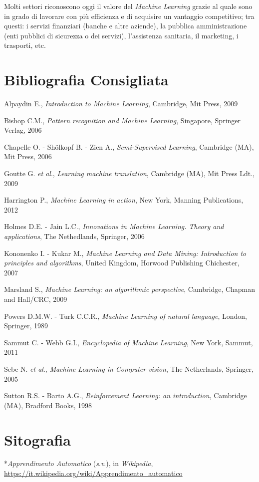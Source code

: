 {{Molti settori riconoscono oggi il valore del \emph{Machine Learning}
grazie al quale sono in grado di lavorare con più efficienza e di
acquisire un vantaggio competitivo; tra questi: i servizi finanziari
(banche e altre aziende), la pubblica amministrazione (enti pubblici di
sicurezza o dei servizi), l'assistenza sanitaria, il marketing, i
trasporti, etc.

\section*{Bibliografia Consigliata}
{\parindent0pt 
Alpaydin E., \emph{Introduction to Machine Learning}, Cambridge, Mit
Press, 2009

Bishop C.M., \emph{Pattern recognition and Machine Learning}, Singapore,
Springer Verlag, 2006

Chapelle O. - Shölkopf B. - Zien A., \emph{Semi-Supervised Learning},
Cambridge (MA), Mit Press, 2006

Goutte G. \emph{et al}., \emph{Learning machine translation}, Cambridge
(MA), Mit Press Ldt., 2009

Harrington P., \emph{Machine Learning in action}, New York, Manning
Publications, 2012

Holmes D.E. - Jain L.C., \emph{Innovations in Machine Learning. Theory
and applications}, The Nethedlands, Springer, 2006

Kononenko I. - Kukar M., \emph{Machine Learning and Data Mining:
Introduction to principles and algorithms}, United Kingdom, Horwood
Publishing Chichester, 2007

Marsland S., \emph{Machine Learning: an algorithmic perspective},
Cambridge, Chapman and Hall/CRC, 2009

Powers D.M.W. - Turk C.C.R., \emph{Machine Learning of natural
language}, London, Springer, 1989

Sammut C. - Webb G.I., \emph{Encyclopedia of Machine Learning}, New
York, Sammut, 2011

Sebe N. \emph{et al}., \emph{Machine Learning in Computer vision}, The
Netherlands, Springer, 2005

Sutton R.S. - Barto A.G., \emph{Reinforcement Learning: an
introduction}, Cambridge (MA), Bradford Books, 1998
}

\section*{Sitografia}
{\parindent0pt 
*\emph{Apprendimento Automatico} (\emph{s}.\emph{v}.), in
\emph{Wikipedia},
\url{https://it.wikipedia.org/wiki/Apprendimento_automatico}

}}}
